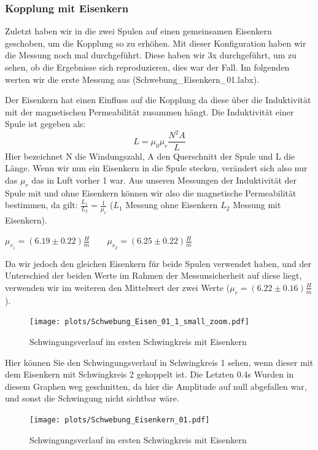 \documentclass[twoside]{protokoll}
\begin{document}
\subsubsection{Kopplung mit Eisenkern}


Zuletzt haben wir in die zwei Spulen auf einen gemeinsamen Eisenkern geschoben, um die Kopplung so zu erhöhen. 
Mit dieser Konfiguration haben wir die Messung noch mal durchgeführt. 
Diese haben wir 3x durchgeführt, um zu sehen, ob die Ergebnisse sich reproduzieren, dies war der Fall.
Im folgenden werten wir die erste Messung aus (Schwebung\_Eisenkern\_01.labx).

Der Eisenkern hat einen Einfluss auf die Kopplung da diese über die Induktivität mit der magnetischen Permeabilität zusammen hängt.
Die Induktivität einer Spule ist gegeben als:
\begin{equation}
L = \mu_0 \mu_r \frac{N^2A}{L}
\end{equation}
Hier bezeichnet N die Windungszahl, A den Querschnitt der Spule und L die Länge.
Wenn wir nun ein Eisenkern in die Spule stecken, verändert sich also nur das $\mu_r$ das in Luft vorher 1 war.
Aus unseren Messungen der Induktivität der Spule mit und ohne Eisenkern können wir also die magnetische Permeabilität bestimmen, da gilt: $\frac{L_1}{L_2} = \frac{1}{\mu_r}$ ($L_1$ Messung ohne Eisenkern $L_2$ Messung mit Eisenkern).
\begin{center}
$\mu_{r_1} = (6.19 \pm 0.22)\frac{H}{m} \qquad \mu_{r_2} = (6.25 \pm 0.22)\frac{H}{m} $
\end{center}

Da wir jedoch den gleichen Eisenkern für beide Spulen verwendet haben, und der Unterschied der beiden Werte im Rahmen der Messunsicherheit auf diese liegt, verwenden wir im weiteren den Mittelwert der zwei Werte ($\mu_r = (6.22 \pm 0.16)\frac{H}{m}$).
\begin{figure}[H]
    \centering
    \texttt{[image: plots/Schwebung\_Eisen\_01\_1\_small\_zoom.pdf]}
    \caption{Schwingungsverlauf im ersten Schwingkreis mit Eisenkern }
\end{figure}

Hier können Sie den Schwingungsverlauf in Schwingkreis 1 sehen, wenn dieser mit dem Eisenkern mit Schwingkreis 2 gekoppelt ist. 
Die Letzten 0.4s Wurden in diesem Graphen weg geschnitten, da hier die Amplitude auf null abgefallen war, und sonst die Schwingung nicht sichtbar wäre.
\begin{figure}[H]
    \centering
    \texttt{[image: plots/Schwebung\_Eisenkern\_01.pdf]}
    \caption{Schwingungsverlauf im ersten Schwingkreis mit Eisenkern }
    \label{Eisenkern beide Schwingungen}
\end{figure}
\end{document}
